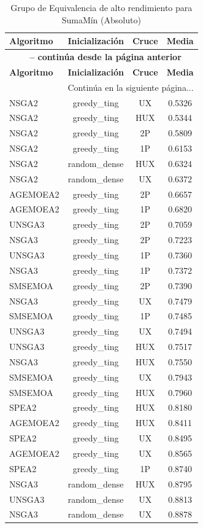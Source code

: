 \begin{longtable}{lccc}
    \caption{Grupo de Equivalencia de alto rendimiento para SumaMín (Absoluto)}
    \label{tab:elite_summin} \\
    \toprule
    \textbf{Algoritmo} & \textbf{Inicialización} & \textbf{Cruce} & \textbf{Media} \\
    \midrule
    \endfirsthead
    \multicolumn{4}{c}{{\bfseries \tablename\ \thetable{} -- continúa desde la página anterior}} \\
    \toprule
    \textbf{Algoritmo} & \textbf{Inicialización} & \textbf{Cruce} & \textbf{Media} \\
    \midrule
    \endhead
    \midrule \multicolumn{4}{r}{{Continúa en la siguiente página...}} \\
    \endfoot
    \bottomrule
    \endlastfoot
    NSGA2 & greedy\_ting & UX & 0.5326 \\
NSGA2 & greedy\_ting & HUX & 0.5344 \\
NSGA2 & greedy\_ting & 2P & 0.5809 \\
NSGA2 & greedy\_ting & 1P & 0.6153 \\
NSGA2 & random\_dense & HUX & 0.6324 \\
NSGA2 & random\_dense & UX & 0.6372 \\
AGEMOEA2 & greedy\_ting & 2P & 0.6657 \\
AGEMOEA2 & greedy\_ting & 1P & 0.6820 \\
UNSGA3 & greedy\_ting & 2P & 0.7059 \\
NSGA3 & greedy\_ting & 2P & 0.7223 \\
UNSGA3 & greedy\_ting & 1P & 0.7360 \\
NSGA3 & greedy\_ting & 1P & 0.7372 \\
SMSEMOA & greedy\_ting & 2P & 0.7390 \\
NSGA3 & greedy\_ting & UX & 0.7479 \\
SMSEMOA & greedy\_ting & 1P & 0.7485 \\
UNSGA3 & greedy\_ting & UX & 0.7494 \\
UNSGA3 & greedy\_ting & HUX & 0.7517 \\
NSGA3 & greedy\_ting & HUX & 0.7550 \\
SMSEMOA & greedy\_ting & UX & 0.7943 \\
SMSEMOA & greedy\_ting & HUX & 0.7960 \\
SPEA2 & greedy\_ting & HUX & 0.8180 \\
AGEMOEA2 & greedy\_ting & HUX & 0.8411 \\
SPEA2 & greedy\_ting & UX & 0.8495 \\
AGEMOEA2 & greedy\_ting & UX & 0.8565 \\
SPEA2 & greedy\_ting & 1P & 0.8740 \\
NSGA3 & random\_dense & HUX & 0.8795 \\
UNSGA3 & random\_dense & UX & 0.8813 \\
NSGA3 & random\_dense & UX & 0.8878 \\
\end{longtable}

